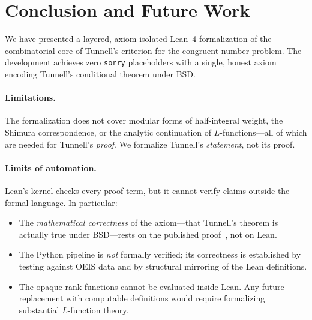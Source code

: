 \documentclass[11pt,a4paper]{article}
\theoremstyle{definition}
\newcommand{\lean}[1]{\texttt{#1}}
\begin{document}
\section{Conclusion and Future Work}\label{sec:conclusion}

We have presented a layered, axiom-isolated Lean~4 formalization of
the combinatorial core of Tunnell's criterion for the congruent
number problem.  The development achieves zero \lean{sorry}
placeholders with a single, honest axiom encoding Tunnell's
conditional theorem under BSD\@.

\paragraph{Limitations.}
The formalization does not cover modular forms of half-integral
weight, the Shimura correspondence, or the analytic continuation
of $L$-functions---all of which are needed for Tunnell's
\emph{proof}.  We formalize Tunnell's \emph{statement}, not its
proof.

\paragraph{Limits of automation.}
Lean's kernel checks every proof term, but it cannot verify
claims outside the formal language.  In particular:
\begin{itemize}[nosep]
  \item The \emph{mathematical correctness} of the axiom---that
    Tunnell's theorem is actually true under BSD---rests on
    the published proof~\cite{Tunnell1983}, not on Lean.
  \item The Python pipeline is \emph{not} formally verified;
    its correctness is established by testing against OEIS data
    and by structural mirroring of the Lean definitions.
  \item The opaque rank functions cannot be evaluated inside Lean.
    Any future replacement with computable definitions would
    require formalizing substantial $L$-function theory.
\end{itemize}
\end{document}
